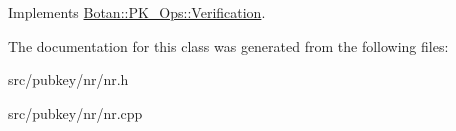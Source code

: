 Implements \hyperlink{classBotan_1_1PK__Ops_1_1Verification_af66d51b7b6ae5e9b851815df23f7db7c}{Botan\-::\-P\-K\-\_\-\-Ops\-::\-Verification}.



The documentation for this class was generated from the following files\-:\begin{DoxyCompactItemize}
\item 
src/pubkey/nr/nr.\-h\item 
src/pubkey/nr/nr.\-cpp\end{DoxyCompactItemize}
